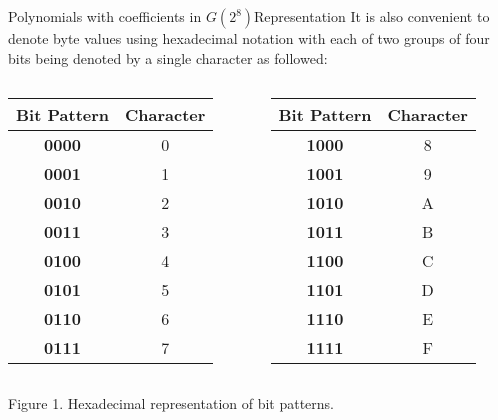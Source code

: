 \begin{frame}[t]{Polynomials with coefficients in $G(2^8)$}{Representation}
	It is also convenient to denote byte values using hexadecimal notation with each of two groups of four bits being denoted by a single character as followed: \\[5pt]

	\begin{columns}
		\tiny 
		\setlength{\tabcolsep}{3pt} 
		\begin{column}{0.5\textwidth}		
			\begin{table}[]
				\begin{tabular}{c|c}
					\textbf{Bit Pattern} & \textbf{Character} \\ \hline
					\textbf{0000} & 0                  \\
					\textbf{0001} & 1                  \\
					\textbf{0010} & 2                  \\
					\textbf{0011} & 3                  \\
					\textbf{0100} & 4                  \\
					\textbf{0101} & 5                  \\
					\textbf{0110} & 6                  \\
					\textbf{0111} & 7                  \\					
				\end{tabular}
			\end{table}
		\end{column}

		
		\begin{column}{0.5\textwidth}  %
			\begin{table}[]
				\begin{tabular}{c|c}
					\textbf{Bit Pattern} & \textbf{Character} \\ \hline
					\textbf{1000} & 8                  \\
					\textbf{1001} & 9                  \\
					\textbf{1010} & A                  \\
					\textbf{1011} & B                  \\	
					\textbf{1100} & C                  \\
					\textbf{1101} & D                  \\
					\textbf{1110} & E                  \\
					\textbf{1111} & F                  \\
					
				\end{tabular}
			\end{table}
		\end{column}
	\end{columns}

	\centering Figure 1. Hexadecimal representation of bit patterns.	
\end{frame}


